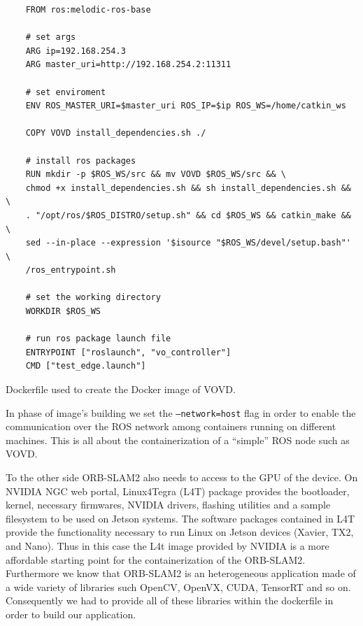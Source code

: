 \begin{listing}[htbp]
	\begin{verbatim}
	FROM ros:melodic-ros-base
	
	# set args
	ARG ip=192.168.254.3
	ARG master_uri=http://192.168.254.2:11311
	
	# set enviroment
	ENV ROS_MASTER_URI=$master_uri ROS_IP=$ip ROS_WS=/home/catkin_ws
	
	COPY VOVD install_dependencies.sh ./
	
	# install ros packages
	RUN mkdir -p $ROS_WS/src && mv VOVD $ROS_WS/src && \
	chmod +x install_dependencies.sh && sh install_dependencies.sh && \
	. "/opt/ros/$ROS_DISTRO/setup.sh" && cd $ROS_WS && catkin_make && \
	sed --in-place --expression '$isource "$ROS_WS/devel/setup.bash"' \
	/ros_entrypoint.sh
	
	# set the working directory
	WORKDIR $ROS_WS
	
	# run ros package launch file
	ENTRYPOINT ["roslaunch", "vo_controller"]
	CMD ["test_edge.launch"]
	\end{verbatim}
	\caption{Dockerfile used to create the Docker image of VOVD.}
	\label{lst:dockerfilevovd}
\end{listing}

In phase of image's building we set the \texttt{--network=host} flag in order to enable the communication over the ROS network among containers running on different machines.
This is all about the containerization of a ``simple'' ROS node such as VOVD.

To the other side ORB-SLAM2 also needs to access to the GPU of the device.
On NVIDIA NGC web portal, Linux4Tegra (L4T) package provides the bootloader, kernel, necessary firmwares, NVIDIA drivers, flashing utilities and a sample filesystem to be used on Jetson systems. The software packages contained in L4T provide the functionality necessary to run Linux on Jetson devices (Xavier, TX2, and Nano).
Thus in this case the L4t image provided by NVIDIA is a more affordable starting point for the containerization of the ORB-SLAM2.
Furthermore we know that ORB-SLAM2 is an heterogeneous application made of a wide variety of libraries such OpenCV, OpenVX, CUDA, TensorRT and so on.
Consequently we had to provide all of these libraries within the dockerfile in order to build our application.




